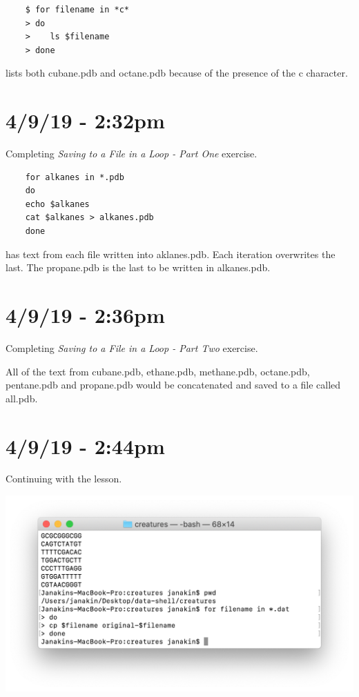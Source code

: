 \documentclass{article}
\begin{document}
\begin{verbatim}
    $ for filename in *c*
    > do
    >    ls $filename
    > done
\end{verbatim} lists both cubane.pdb and octane.pdb because of the presence of the c character.

\section*{4/9/19 - 2:32pm}

Completing \textit{Saving to a File in a Loop - Part One} exercise.

\begin{verbatim}
    for alkanes in *.pdb
    do
    echo $alkanes
    cat $alkanes > alkanes.pdb
    done
\end{verbatim} has text from each file written into aklanes.pdb. Each iteration overwrites the last. The propane.pdb is the last to be written in alkanes.pdb.

\section*{4/9/19 - 2:36pm}

Completing \textit{Saving to a File in a Loop - Part Two} exercise.

All of the text from cubane.pdb, ethane.pdb, methane.pdb, octane.pdb, pentane.pdb and propane.pdb would be concatenated and saved to a file called all.pdb.

\section*{4/9/19 - 2:44pm}

Continuing with the lesson.

\includegraphics[width=\textwidth]{figp.png}
\end{document}
